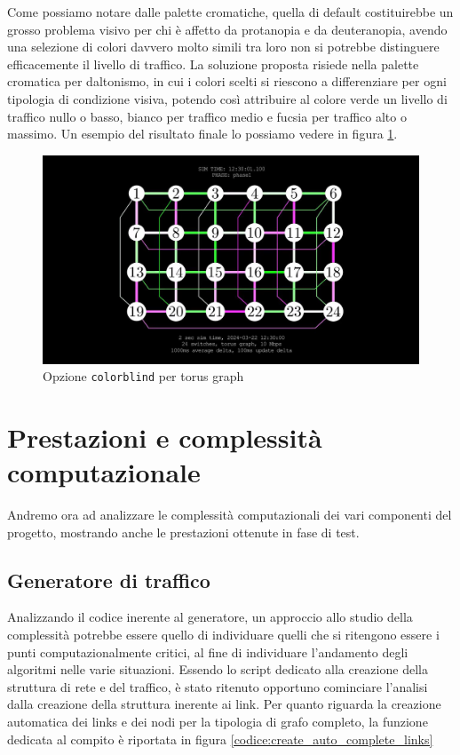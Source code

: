 \documentclass[binding=0.6cm]{sapthesis}
\begin{document}
Come possiamo notare dalle palette cromatiche, quella di default costituirebbe un grosso problema visivo per chi è affetto da protanopia e da deuteranopia, avendo
una selezione di colori davvero molto simili tra loro non si potrebbe distinguere efficacemente il livello di traffico. La soluzione proposta
risiede nella palette cromatica per daltonismo, in cui i colori scelti si riescono a differenziare per ogni tipologia di condizione visiva, potendo così
attribuire al colore verde un livello di traffico nullo o basso, bianco per traffico medio e fucsia per traffico alto o massimo. Un esempio
del risultato finale lo possiamo vedere in figura \ref{fig:colorblind_torus}.

\begin{figure}[h]
    \centering
    \includegraphics[width=1\textwidth]{immagini/colorblind_torus.JPG}
    \caption{Opzione \texttt{colorblind} per torus graph}
    \label{fig:colorblind_torus}
\end{figure}

\chapter{Prestazioni e complessità computazionale}

Andremo ora ad analizzare le complessità computazionali dei vari componenti del progetto, mostrando anche le prestazioni ottenute in fase di test.

\section{Generatore di traffico}
Analizzando il codice inerente al generatore, un approccio allo studio della complessità potrebbe essere quello di individuare quelli che si ritengono essere
i punti computazionalmente critici, al fine di individuare l'andamento degli algoritmi nelle varie situazioni. Essendo lo script dedicato alla creazione della struttura di rete e del traffico,
è stato ritenuto opportuno cominciare l'analisi dalla creazione della struttura inerente ai link.
Per quanto riguarda la creazione automatica dei links e dei nodi
per la tipologia di grafo completo, la funzione dedicata al compito è riportata in figura \ref{codice:create_auto_complete_links}
\end{document}
